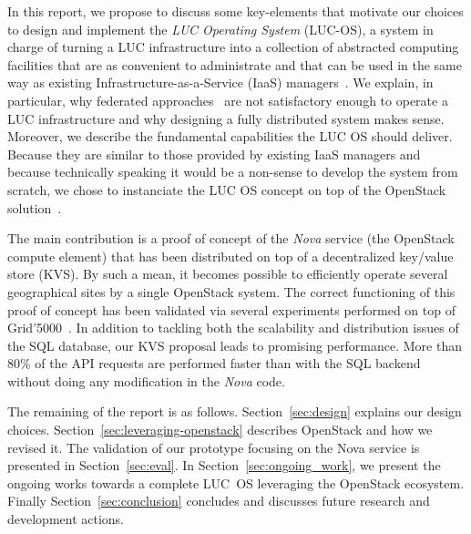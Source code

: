 %
%
%
In this report, we propose to discuss some key-elements that motivate our choices to design and implement the \emph{LUC Operating System} (LUC-OS), a
system in charge of turning a LUC infrastructure into a collection of abstracted computing facilities that are as convenient to administrate and that
can be used in the same way as existing Infrastructure-as-a-Service (IaaS) managers~\cite{cloudstack,opennebula,openstack}. We explain, in particular,
why federated approaches~\cite{buyya:intercloud} are not satisfactory enough to operate a LUC infrastructure and why designing a fully distributed
system makes sense. Moreover, we describe the fundamental capabilities the LUC OS should deliver. Because they are similar to those provided by
existing IaaS managers and because technically speaking it would be a non-sense to develop the system from scratch, we chose to instanciate the LUC OS
concept on top of the OpenStack solution~\cite{openstack}.

The main contribution is a proof of concept of the \emph{Nova} service (the OpenStack compute element) that has been distributed on top of a
decentralized key/value store (KVS). By such a mean, it becomes possible to efficiently operate several geographical sites by a single OpenStack
system. The correct functioning of this proof of concept has been validated via several experiments performed on top of Grid'5000~\cite{grid5000}. In
addition to tackling both the scalability and distribution issues of the SQL database, our KVS proposal leads to promising performance. More than 80\%
of the API requests are performed faster than with the SQL backend without doing any modification in the \emph{Nova} code.

The remaining of the report is as follows. Section~\ref{sec:design} explains our design choices. Section~\ref{sec:leveraging-openstack} describes
OpenStack and how we revised it. The validation of our prototype focusing on the Nova service is presented in Section~\ref{sec:eval}. In
Section~\ref{sec:ongoing_work}, we present the ongoing works towards a complete LUC~OS leveraging the OpenStack ecosystem. Finally
Section~\ref{sec:conclusion} concludes and discusses future research and development actions.
